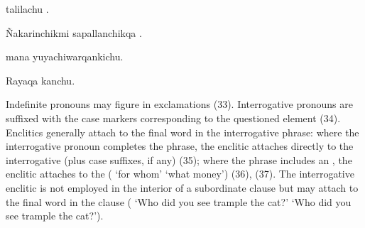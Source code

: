 {%
{ talilachu .}%
{}%
{}{}%

%
{\~Nakarinchikmi sapallanchikqa .}%
{}%
{}{}%

%
{ mana yuyachiwarqankichu.}%
{}%
{}{}%

%
{Rayaqa   kanchu.}%
{}%
{}{}%

Indefinite pronouns may figure in exclamations (33). Interrogative pronouns are suffixed with the case markers corresponding to the questioned element (34). Enclitics generally attach to the final word in the interrogative phrase: where the interrogative pronoun completes the phrase, the enclitic attaches directly to the interrogative (plus case suffixes, if any) (35); where the phrase includes an , the enclitic attaches to the  ( `for whom'  `what money') (36), (37). The interrogative enclitic is not employed in the interior of a subordinate clause but may attach to the final word in the clause ( `Who did you see trample the cat?'  `Who did you see trample the cat?').

}
